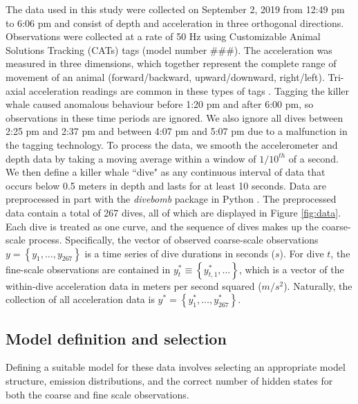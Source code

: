 The data used in this study were collected on September 2, 2019 from 12:49 pm to 6:06 pm and consist of depth and acceleration in three orthogonal directions. Observations were collected at a rate of 50 Hz using Customizable Animal Solutions Tracking (CATs) tags (model number \#\#\#). The acceleration was measured in three dimensions, which together represent the complete range of movement of an animal (forward/backward, upward/downward, right/left). Tri-axial acceleration readings are common in these types of tags \citep{Cade:2017,Fehlmann:2017,Wright:2017}. Tagging the killer whale caused anomalous behaviour before 1:20 pm and after 6:00 pm, so observations in these time periods are ignored. We also ignore all dives between 2:25 pm and 2:37 pm and between 4:07 pm and 5:07 pm due to a malfunction in the tagging technology. To process the data, we smooth the accelerometer and depth data by taking a moving average within a window of $1/10^{th}$ of a second. We then define a killer whale ``dive" as any continuous interval of data that occurs below 0.5 meters in depth and lasts for at least 10 seconds. Data are preprocessed in part with the \textit{divebomb} package in Python \citep{Nunes:2018}. The preprocessed data contain a total of 267 dives, all of which are displayed in Figure \ref{fig:data}. Each dive is treated as one curve, and the sequence of dives makes up the coarse-scale process. Specifically, the vector of observed coarse-scale observations $y = \left\{y_1,\ldots,y_{267}\right\}$ is a time series of dive durations in seconds ($s$). For dive $t$, the fine-scale observations are contained in $y^*_{t} \equiv \left\{y^*_{t,1},\ldots \right\}$, which is a vector of the within-dive acceleration data in meters per second squared ($m/s^2$). Naturally, the collection of all acceleration data is $y^* = \left\{y^*_1,\ldots,y^*_{267}\right\}$.

\subsection{Model definition and selection}
\label{subsec:model_selection}

Defining a suitable model for these data involves selecting an appropriate model structure, emission distributions, and the correct number of hidden states for both the coarse and fine scale observations.

